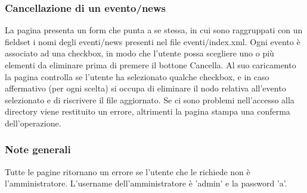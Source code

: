 \documentclass[a4paper,10pt]{article}
\begin{document}
\subsubsection{Cancellazione di un evento/news}
La pagina presenta un form che punta a se stessa, in cui sono raggruppati con un fieldset i  nomi degli eventi/news presenti nel file eventi/index.xml. Ogni evento \`e associato ad una checkbox, in modo che l'utente possa scegliere uno o pi\`u elementi da eliminare prima di premere il bottone Cancella. Al suo caricamento la pagina controlla se l'utente ha selezionato qualche checkbox, e in caso affermativo (per ogni scelta) si occupa di eliminare il nodo relativa all'evento selezionato e di riscrivere il file aggiornato.
Se ci sono problemi nell'accesso alla directory viene restituito un errore, altrimenti la pagina stampa una conferma dell'operazione.

\subsubsection{Note generali}
Tutte le pagine ritornano un errore se l'utente che le richiede non \`e l'amministratore. L'username dell'amministratore \`e 'admin' e la password 'a'.
\end{document}
